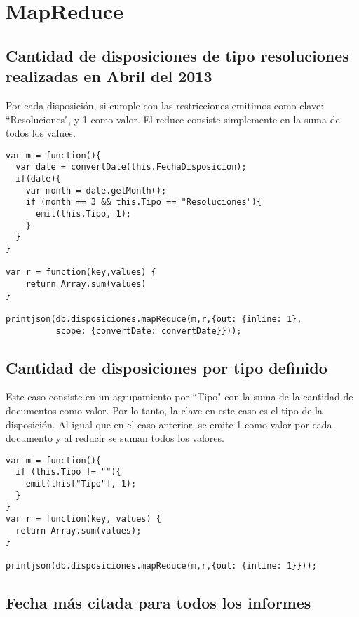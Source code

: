 \section{MapReduce}

\subsection{Cantidad de disposiciones de tipo resoluciones realizadas en Abril del 2013}

Por cada disposición, si cumple con las restricciones emitimos como clave: ``Resoluciones", y
1 como valor. El reduce consiste simplemente en la suma de todos los values.

\begin{lstlisting}
var m = function(){
  var date = convertDate(this.FechaDisposicion);
  if(date){
    var month = date.getMonth();
    if (month == 3 && this.Tipo == "Resoluciones"){
      emit(this.Tipo, 1);
    }
  }
}

var r = function(key,values) {
    return Array.sum(values)
}

printjson(db.disposiciones.mapReduce(m,r,{out: {inline: 1},
          scope: {convertDate: convertDate}}));
\end{lstlisting}

\vspace{4em}

\subsection{Cantidad de disposiciones por tipo definido}

Este caso consiste en un agrupamiento por ``Tipo" con la suma de la cantidad de documentos
como valor. Por lo tanto, la clave en este caso es el tipo de la disposición. Al igual que
en el caso anterior, se emite 1 como valor por cada documento y al reducir se suman todos
los valores.

\begin{lstlisting}
var m = function(){
  if (this.Tipo != ""){
    emit(this["Tipo"], 1);
  }
}
var r = function(key, values) {
  return Array.sum(values);
}

printjson(db.disposiciones.mapReduce(m,r,{out: {inline: 1}}));
\end{lstlisting}

\subsection{Fecha más citada para todos los informes}

